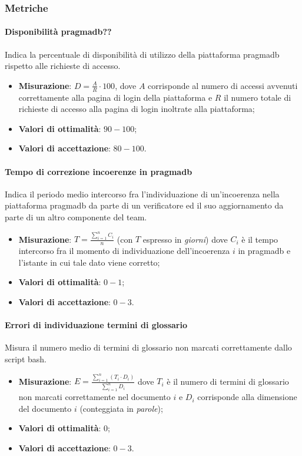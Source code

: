 \subsubsection{Metriche}
\paragraph{Disponibilità pragmadb??}
\label{dispPragmaDB}
Indica la percentuale di disponibilità di utilizzo della piattaforma pragmadb rispetto alle richieste di accesso.
\begin{itemize}
\item \textbf{Misurazione}: $ D = \frac{A}{R} \cdot 100 $, dove $A$ corrisponde al numero di accessi avvenuti correttamente alla pagina di login della piattaforma e $R$ il numero totale di richieste di accesso alla pagina di login inoltrate alla piattaforma;
\item \textbf{Valori di ottimalità}: $90 - 100$;
\item \textbf{Valori di accettazione}: $80 - 100$.
\end{itemize}
\paragraph{Tempo di correzione incoerenze in pragmadb}
\label{tCorrIncoerPragmaDB}
Indica il periodo medio intercorso fra l'individuazione di un'incoerenza nella piattaforma pragmadb da parte di un verificatore ed il suo aggiornamento da parte di un altro componente del team.
\begin{itemize}
\item \textbf{Misurazione}: $T = \frac{\sum_{i=1}^{n} C_{i}}{n}$ (con $T$ espresso in \textit{giorni}) dove $C_{i}$ è il tempo intercorso fra il momento di individuazione dell'incoerenza $i$ in pragmadb e l'istante in cui tale dato viene corretto;
\item \textbf{Valori di ottimalità}: $0 - 1$;
\item \textbf{Valori di accettazione}: $0 - 3$.
\end{itemize}
\paragraph{Errori di individuazione termini di glossario}
\label{errIndividTermGloss}
Misura il numero medio di termini di glossario non marcati correttamente dallo script bash.
\begin{itemize}
\item \textbf{Misurazione}: $E = \frac{\sum_{i=1}^{n} (T_{i} \cdot D_{i})}{\sum_{i=1}^{n} D_{i}}$ dove $T_{i}$ è il numero di termini di glossario non marcati correttamente nel documento $i$ e $D_{i}$ corrisponde alla dimensione del documento $i$ (conteggiata in \textit{parole});
\item \textbf{Valori di ottimalità}: $0$;
\item \textbf{Valori di accettazione}: $0 - 3$.
\end{itemize}
